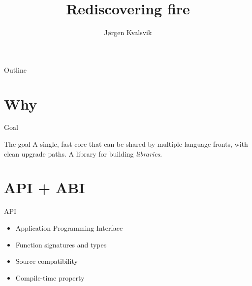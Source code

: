 \documentclass[pdf]{beamer}
\title{Rediscovering fire}
\author{Jørgen Kvalsvik}
\begin{document}
\maketitle

\begin{frame}{Outline}
    \tableofcontents
\end{frame}

\section{Why}

\begin{frame}{Goal}
    \begin{block}{The goal}
        A single, fast core that can be shared by multiple language fronts,
        with clean upgrade paths. A library for building \emph{libraries}.
    \end{block}
\end{frame}

\section{API + ABI}

\begin{frame}
    \begin{block}{API}
        \pause
        \begin{itemize}[<+>]
            \item Application Programming Interface
            \item Function signatures and types
            \item Source compatibility
            \item Compile-time property
        \end{itemize}
    \end{block}

\end{frame}
\end{document}
